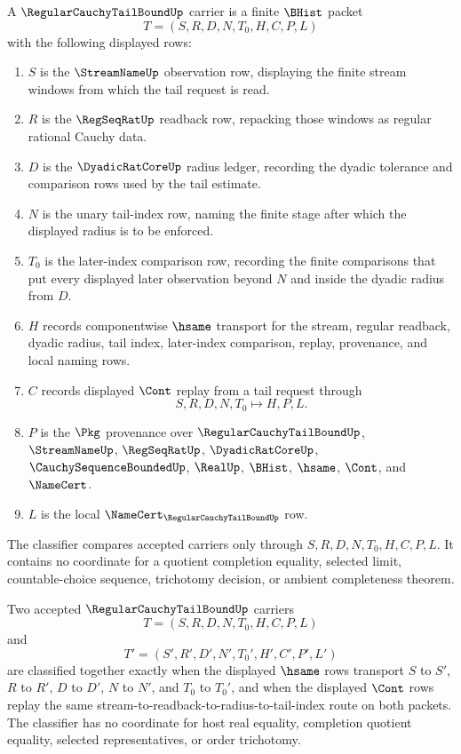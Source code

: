 \begin{definition}
\label{def:regular-cauchy-tail-bound-carrier}
A $\RegularCauchyTailBoundUp$ carrier is a finite $\BHist$ packet
$$
T=(S,R,D,N,T_0,H,C,P,L)
$$
with the following displayed rows:
\begin{enumerate}
\item $S$ is the $\StreamNameUp$ observation row, displaying the finite stream windows from which the tail request is read.
\item $R$ is the $\RegSeqRatUp$ readback row, repacking those windows as regular rational Cauchy data.
\item $D$ is the $\DyadicRatCoreUp$ radius ledger, recording the dyadic tolerance and comparison rows used by the tail estimate.
\item $N$ is the unary tail-index row, naming the finite stage after which the displayed radius is to be enforced.
\item $T_0$ is the later-index comparison row, recording the finite comparisons that put every displayed later observation beyond $N$ and inside the dyadic radius from $D$.
\item $H$ records componentwise $\hsame$ transport for the stream, regular readback, dyadic radius, tail index, later-index comparison, replay, provenance, and local naming rows.
\item $C$ records displayed $\Cont$ replay from a tail request through
$$
S,R,D,N,T_0 \longmapsto H,P,L .
$$
\item $P$ is the $\Pkg$ provenance over $\RegularCauchyTailBoundUp$, $\StreamNameUp$, $\RegSeqRatUp$, $\DyadicRatCoreUp$, $\CauchySequenceBoundedUp$, $\RealUp$, $\BHist$, $\hsame$, $\Cont$, and $\NameCert$.
\item $L$ is the local $\NameCert_{\RegularCauchyTailBoundUp}$ row.
\end{enumerate}
The classifier compares accepted carriers only through $S,R,D,N,T_0,H,C,P,L$. It contains no coordinate for a quotient completion equality, selected limit, countable-choice sequence, trichotomy decision, or ambient completeness theorem.
\end{definition}

\begin{definition}
\label{def:regular-cauchy-tail-bound-classifier}
Two accepted $\RegularCauchyTailBoundUp$ carriers
$$
T=(S,R,D,N,T_0,H,C,P,L)
$$
and
$$
T'=(S',R',D',N',T_0',H',C',P',L')
$$
are classified together exactly when the displayed $\hsame$ rows transport $S$ to $S'$, $R$ to $R'$, $D$ to $D'$, $N$ to $N'$, and $T_0$ to $T_0'$, and when the displayed $\Cont$ rows replay the same stream-to-readback-to-radius-to-tail-index route on both packets. The classifier has no coordinate for host real equality, completion quotient equality, selected representatives, or order trichotomy.
\end{definition}


